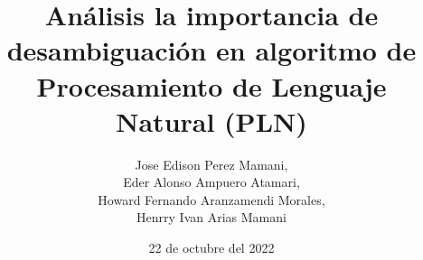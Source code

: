 \documentclass[11pt,openright,final]{unsa}
\title{Análisis la importancia de desambiguación en algoritmo de Procesamiento de Lenguaje Natural (PLN)  }
\author{Jose Edison Perez Mamani,\\
Eder Alonso Ampuero Atamari,\\
Howard Fernando Aranzamendi Morales,\\
Henrry Ivan Arias Mamani
}%
\date{22 de octubre del 2022}
\begin{document}
\makeFirstCover \makeSecondCover %
\begin{frontmatter}

\approved{\cuatro}%

\dedicatory
\begin{singlespace}
\tableofcontents \listoffigures \listoftables \pagebreak
\end{singlespace}

%
%
\end{frontmatter}%
\pagestyle{fancyplain}





\begin{singlespace}
\end{singlespace}
\end{document}
